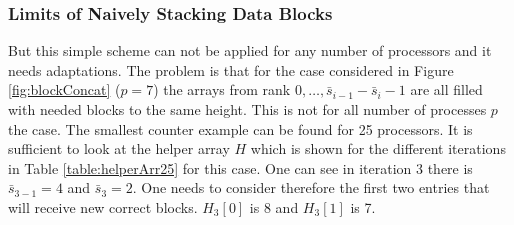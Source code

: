 \subsubsection{Limits of Naively Stacking Data Blocks}
But this simple scheme can not be applied for any number of processors and it needs adaptations. The problem is that for the case considered in Figure \ref{fig:blockConcat} ($p=7$) the arrays from rank $0, \dots, \bar{s}_{i-1} - \bar{s}_i-1$ are all filled with needed blocks to the same height. This is not for all number of processes $p$ the case. The smallest counter example can be found for 25 processors. It is sufficient to look at the helper array $H$ which is shown for the different iterations in Table \ref{table:helperArr25} for this case. One can see in iteration 3 there is $\bar{s}_{3-1}=4$ and $\bar{s}_{3}=2$. One needs to consider therefore the first two entries that will receive new correct blocks. $H_3[0]$ is 8 and $H_3[1]$ is 7.
